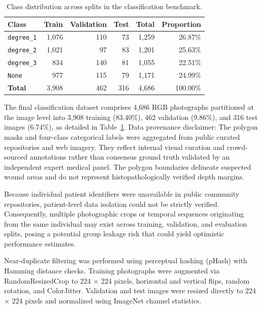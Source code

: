 \documentclass[11pt,a4paper]{article}
\begin{document}
\begin{table}[H]
\centering
\caption{Class distribution across splits in the classification benchmark.}
\label{tab:table2}
\small
\begin{tabular}{lrrrrr}
\toprule
\textbf{Class} & \textbf{Train} & \textbf{Validation} & \textbf{Test} & \textbf{Total} & \textbf{Proportion} \\
\midrule
\texttt{degree\_1} & 1,076 & 110 & 73  & 1,259 & 26.87\% \\
\texttt{degree\_2} & 1,021 & 97  & 83  & 1,201 & 25.63\% \\
\texttt{degree\_3} & 834   & 140 & 81  & 1,055 & 22.51\% \\
\texttt{None}     & 977   & 115 & 79  & 1,171 & 24.99\% \\
\midrule
\textbf{Total}    & 3,908 & 462 & 316 & 4,686 & 100.00\% \\
\bottomrule
\end{tabular}
\end{table}

The final classification dataset comprises 4,686 RGB photographs partitioned at the image level into 3,908 training (83.40\%), 462 validation (9.86\%), and 316 test images (6.74\%), as detailed in Table~\ref{tab:table2}. Data provenance disclaimer: The polygon masks and four-class categorical labels were aggregated from public curated repositories and web imagery. They reflect internal visual curation and crowd-sourced annotations rather than consensus ground truth validated by an independent expert medical panel. The polygon boundaries delineate suspected wound areas and do not represent histopathologically verified depth margins.

Because individual patient identifiers were unavailable in public community repositories, patient-level data isolation could not be strictly verified. Consequently, multiple photographic crops or temporal sequences originating from the same individual may exist across training, validation, and evaluation splits, posing a potential group leakage risk that could yield optimistic performance estimates.

Near-duplicate filtering was performed using perceptual hashing (pHash) with Hamming distance checks. Training photographs were augmented via RandomResizedCrop to 224 $\times$ 224 pixels, horizontal and vertical flips, random rotation, and ColorJitter. Validation and test images were resized directly to 224 $\times$ 224 pixels and normalized using ImageNet channel statistics.
\end{document}
